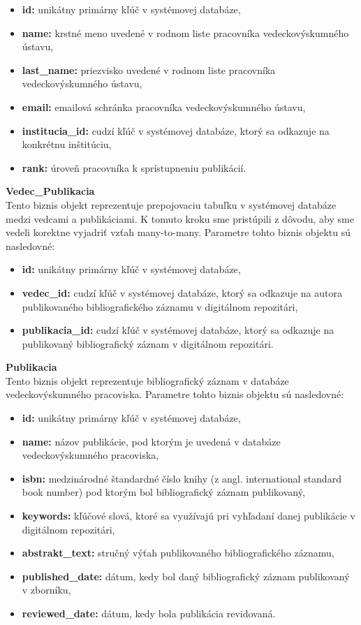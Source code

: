 \documentclass[10pt,oneside,slovak,a4paper]{article}
\begin{document}
\begin{itemize}
\item \textbf{id:} unikátny primárny kľúč v systémovej databáze,
\item \textbf{name:} krstné meno uvedené v rodnom liste pracovníka vedeckovýskumného ústavu,
\item \textbf{last\_name:} priezvisko uvedené v rodnom liste pracovníka vedeckovýskumného ústavu,
\item \textbf{email:} emailová schránka pracovníka vedeckovýskumného ústavu,
\item \textbf{institucia\_id:} cudzí kľúč v systémovej databáze, ktorý sa odkazuje na konkrétnu inštitúciu,
\item \textbf{rank:} úroveň pracovníka k sprístupneniu publikácií.
\end{itemize}

\textbf{Vedec\_Publikacia}\\
Tento biznis objekt reprezentuje prepojovaciu tabuľku v systémovej databáze medzi vedcami a publikáciami. K tomuto kroku sme pristúpili z dôvodu, aby sme vedeli korektne vyjadriť vzťah many-to-many. Parametre tohto biznis objektu sú nasledovné:

\begin{itemize}
\item \textbf{id:} unikátny primárny kľúč v systémovej databáze,
\item \textbf{vedec\_id:} cudzí kľúč v systémovej databáze, ktorý sa odkazuje na autora publikovaného bibliografického záznamu v digitálnom repozitári,
\item \textbf{publikacia\_id:} cudzí kľúč v systémovej databáze, ktorý sa odkazuje na publikovaný bibliografický záznam v digitálnom repozitári.
\end{itemize}

\textbf{Publikacia}\\
Tento biznis objekt reprezentuje bibliografický záznam v databáze vedeckovýskumného pracoviska. Parametre tohto biznis objektu sú nasledovné:

\begin{itemize}
\item \textbf{id:} unikátny primárny kľúč v systémovej databáze,
\item \textbf{name:} názov publikácie, pod ktorým je uvedená v databáze vedeckovýskumného pracoviska,
\item \textbf{isbn:} medzinárodné štandardné číslo knihy (z angl. international standard book number) pod ktorým bol bibliografický záznam publikovaný,
\item \textbf{keywords:} kľúčové slová, ktoré sa využívajú pri vyhľadaní danej publikácie v digitálnom repozitári,
\item \textbf{abstrakt\_text:} stručný výťah publikovaného bibliografického záznamu,
\item \textbf{published\_date:} dátum, kedy bol daný bibliografický záznam publikovaný v zborníku,
\item \textbf{reviewed\_date:} dátum, kedy bola publikácia revidovaná. 
\end{itemize}
\end{document}
